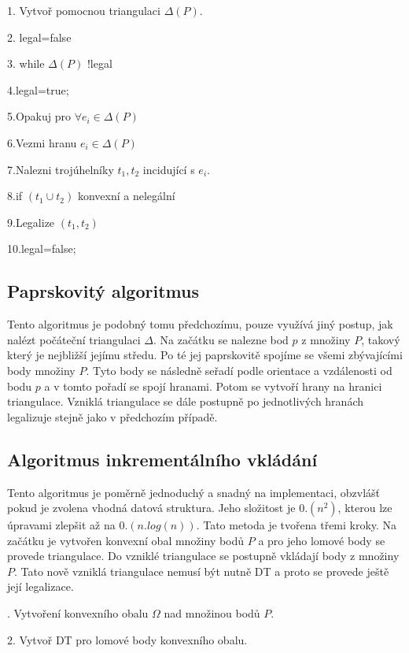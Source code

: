 \documentclass[12pt,a4paper]{article}
\begin{document}
1. Vytvoř pomocnou triangulaci $\Delta(P)$.

2. legal=false

3. while $\Delta(P)$ !legal

4.\indent legal=true;

5.\indent Opakuj pro $\forall e_i \in \Delta(P)$

6.\indent \indent Vezmi hranu $e_i \in \Delta(P)$

7.\indent \indent Nalezni trojúhelníky $t_1,t_2$ incidující s $e_i$.

8.\indent \indent if $(t_1 \cup t_2)$ konvexní a nelegální

9.\indent \indent \indent  Legalize $(t_1,t_2)$

10.\indent \indent \indent legal=false;


\subsection{Paprskovitý algoritmus}

Tento algoritmus je podobný tomu předchozímu, pouze využívá jiný postup, jak nalézt počáteční triangulaci $\Delta$. Na začátku se nalezne bod $p$ z množiny $P$, takový který je nejbližší jejímu středu. Po té jej paprskovitě spojíme se všemi zbývajícími body množiny $P$. Tyto body se následně seřadí podle orientace a vzdálenosti od bodu $p$ a v tomto pořadí se spojí hranami. Potom se vytvoří hrany na hranici triangulace. Vzniklá triangulace se dále postupně po jednotlivých hranách legalizuje stejně jako v předchozím případě.


\subsection{Algoritmus inkrementálního vkládání}

Tento algoritmus je poměrně jednoduchý a snadný na implementaci, obzvlášť pokud je zvolena vhodná datová struktura. Jeho složitost je $0.(n^2)$, kterou lze úpravami zlepšit až na $0.(n.log(n))$. Tato metoda je tvořena třemi kroky. Na začátku je vytvořen konvexní obal množiny bodů $P$ a pro jeho lomové body se provede triangulace. Do vzniklé triangulace se postupně vkládají body z množiny $P$. Tato nově vzniklá triangulace nemusí být nutně DT a proto se provede ještě její legalizace.

.  Vytvoření konvexního obalu $\Omega$ nad množinou bodů $P$.

2.  Vytvoř DT pro lomové body konvexního obalu.
\end{document}
